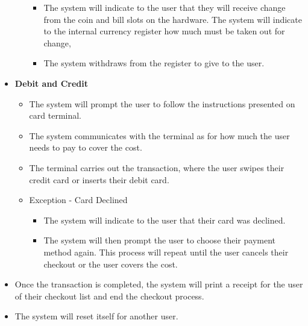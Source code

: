 \begin{itemize}
\begin{itemize}
\begin{itemize}
            \item The system will indicate to the user that they will receive 
            change from the coin and bill slots on the hardware. The system 
            will indicate to the internal currency register how much must be 
            taken out for change,
            \item The system withdraws from the register to give to the user.
        \end{itemize}
    \end{itemize}
    \item \textbf{Debit and Credit}
    \begin{itemize}
        \item The system will prompt the user to follow the instructions 
        presented on card terminal.
        \item The system communicates with the terminal as for how much the 
        user needs to pay to cover the cost.
        \item The terminal carries out the transaction, where the user swipes 
        their credit card or inserts their debit card.
        \item Exception - Card Declined
        \begin{itemize}
            \item The system will indicate to the user that their card 
            was declined.
            \item The system will then prompt the user to choose their payment 
            method again. This process will repeat until the user cancels 
            their checkout or the user covers the cost.
        \end{itemize}
    \end{itemize}
    \item Once the transaction is completed, the system will print a receipt 
    for the user of their checkout list and end the checkout process.
    \item The system will reset itself for another user.
\end{itemize}

